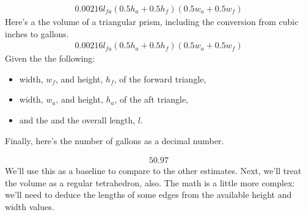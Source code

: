 \documentclass[letterpaper,10pt,english]{sphinxmanual}
\begin{document}
\begin{sphinxVerbatim}[commandchars=\\\{\}]
 
\end{sphinxVerbatim}
\begin{equation*}
\begin{split}\displaystyle 0.00216 l_{fa} \left(0.5 h_{a} + 0.5 h_{f}\right) \left(0.5 w_{a} + 0.5 w_{f}\right)\end{split}
\end{equation*}
\sphinxAtStartPar
Here’s a the volume of a triangular prism, including the conversion from cubic inches to gallons.
\begin{equation}\label{equation:index:prism_mid}
\begin{split}\displaystyle 0.00216 l_{fa} \left(0.5 h_{a} + 0.5 h_{f}\right) \left(0.5 w_{a} + 0.5 w_{f}\right)\end{split}
\end{equation}
\sphinxAtStartPar
Given the the following:
\begin{itemize}
\item {} 
\sphinxAtStartPar
width, \(w_f\), and height, \(h_f\), of the forward triangle,

\item {} 
\sphinxAtStartPar
width, \(w_a\), and height, \(h_a\), of the aft triangle,

\item {} 
\sphinxAtStartPar
and the and the overall length, \(l\).

\end{itemize}

\sphinxAtStartPar
Finally, here’s the number of gallons as a decimal number.

\begin{sphinxVerbatim}[commandchars=\\\{\}]
 
\end{sphinxVerbatim}
\begin{equation*}
\begin{split}\displaystyle 50.97\end{split}
\end{equation*}
\sphinxAtStartPar
We’ll use this as a baseline to compare to the other estimates.  Next, we’ll treat the volume as a regular tetrahedron, also. The math is a little more complex: we’ll need to deduce the lengths of some edges from the available height and width values.
\end{document}
